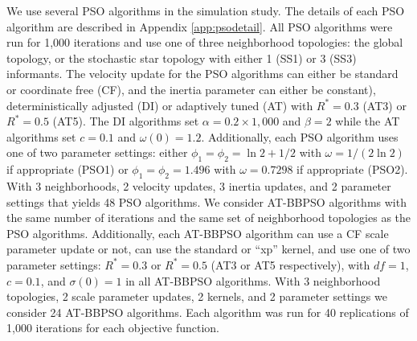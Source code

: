 \documentclass[cmbright]{staauth}
\begin{document}
We use several PSO algorithms in the simulation study. The details of each PSO algorithm are described in Appendix \ref{app:psodetail}. All PSO algorithms were run for 1,000 iterations and use one of three neighborhood topologies: the global topology, or the stochastic star topology with either 1 (SS1) or 3 (SS3) informants. The velocity update for the PSO algorithms can either be standard or coordinate free (CF), and the inertia parameter can either be constant), deterministically adjusted (DI) or adaptively tuned (AT) with $R^*=0.3$ (AT3) or $R^*=0.5$ (AT5). The DI algorithms set $\alpha=0.2\times 1,000$ and $\beta=2$ while the AT algorithms set $c=0.1$ and $\omega(0)=1.2$. Additionally, each PSO algorithm uses one of two parameter settings: either $\phi_1=\phi_2=\ln2 + 1/2$ with $\omega=1/(2\ln2)$ if appropriate (PSO1) or $\phi_1=\phi_2=1.496$ with $\omega=0.7298$ if appropriate (PSO2). With 3 neighborhoods, 2 velocity updates, 3 inertia updates, and 2 parameter settings that yields 48 PSO algorithms. We consider AT-BBPSO algorithms with the same number of iterations and the same set of neighborhood topologies as the PSO algorithms. Additionally, each AT-BBPSO algorithm can use a CF scale parameter update or not, can use the standard or ``xp'' kernel, and use one of two parameter settings: $R^*=0.3$ or $R^*=0.5$ (AT3 or AT5 respectively), with $df=1$, $c=0.1$, and $\sigma(0)=1$ in all AT-BBPSO algorithms. With 3 neighborhood topologies, 2 scale parameter updates, 2 kernels, and 2 parameter settings we consider 24 AT-BBPSO algorithms. Each algorithm was run for 40 replications of 1,000 iterations for each objective function.
\end{document}
